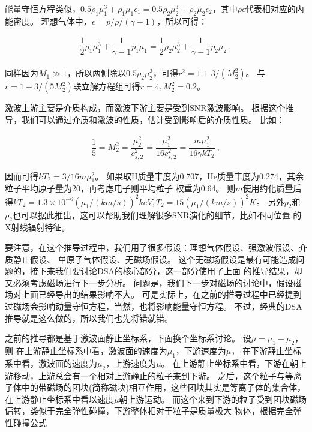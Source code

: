 能量守恒方程类似，$0.5\rho_1\mu_1^3+\rho_1\mu_1\epsilon_1=
0.5\rho_2\mu_2^3+\rho_2\mu_2\epsilon_2$，其中$\rho\epsilon$代表相对应的内能密度。
理想气体中，$\epsilon=p/\rho/(\gamma-1)$，所以可得：

\begin{equation}
    \begin{aligned}
      \dfrac{1}{2}\rho_1\mu_1^3+\dfrac{1}{\gamma-1}p_1\mu_1=
      \dfrac{1}{2}\rho_2\mu_2^3+\dfrac{1}{\gamma-1}p_2\mu_2\ ,
    \end{aligned}
\end{equation}

同样因为$M_1\gg 1$，所以两侧除以$0.5\rho_2\mu_2^3$，可得$r^2=1+3/(M_{2}^{2})$。
与$r=1+3/(5 M_{2}^{2})$联立解方程组可得$r=4, M_{2}^{2}=0.2$。

激波上游主要是介质构成，而激波下游主要是受到SNR激波影响。
根据这个推导，我们可以通过介质和激波的性质，估计受到影响后的介质性质。
比如：

\begin{equation}
    \begin{aligned}
      \dfrac{1}{5}=M_{2}^{2}=\dfrac{\mu_{2}^{2}}{c_{s, 2}^{2}}=
      \dfrac{\mu_{1}^{2}}{16 c_{s, 2}^{2}}=\dfrac{m \mu_{1}^{2}}{16 \gamma k T_{2}}\ ,
    \end{aligned}
\end{equation}

因而可得$k T_{2}=3/16 m \mu_{1}^{2}$。
如果取H质量丰度为0.707，He质量丰度为0.274，其余粒子平均原子量为20，再考虑电子则平均粒子
权重为0.64。
则$m$使用约化质量后得$k T_{2}=1.3 \times 10^{-6}(\mu_1/(km/s))^2 keV, T_2 =
15 (\mu_1/(km/s))^2 K$。
另外$p_2$和$\rho_2$也可以据此推出，这可以帮助我们理解很多SNR演化的细节，比如不同位置
的X射线辐射特征。

要注意，在这个推导过程中，我们用了很多假设：理想气体假设、强激波假设、介质静止假设、
单原子气体假设、无磁场假设。
这个无磁场假设是最有可能造成问题的，接下来我们要讨论DSA的核心部分，这一部分使用了上面
的推导结果，却又必须考虑磁场进行下一步分析。
问题是，我们下一步对磁场的讨论中，假设磁场对上面已经导出的结果影响不大。
可是实际上，在之前的推导过程中已经提到过磁场会影响动量守恒方程，当然，也将影响能量守恒方程。
不过，经典的DSA推导就是这么做的，所以我们也先将错就错。

之前的推导都是基于激波面静止坐标系，下面换个坐标系讨论。
设$\mu=\mu_1-\mu_2$，则
在上游静止坐标系中看，激波面的速度为$\mu_1$，下游速度为$\mu$，
在下游静止坐标系中看，激波面的速度为$\mu_2$，上游速度为$\mu$。
在上游静止坐标系中看，下游在朝上游移动，上游总会有一个相对上游静止的粒子来到下游。
之后，这个粒子与等离子体中的带磁场的团块(简称磁块)相互作用，这些团块其实是等离子体的集合体，
在上游静止坐标系中看以速度$\mu$朝上游运动。
而这个来到下游的粒子受到团块磁场偏转，类似于完全弹性碰撞，下游整体相对于粒子是质量极大
物体，根据完全弹性碰撞公式

